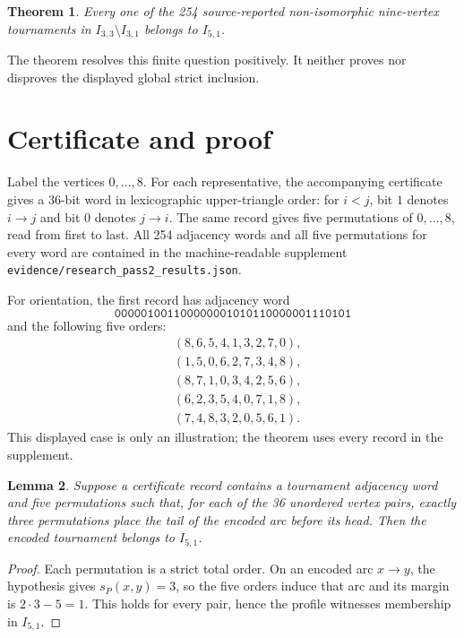 \documentclass[11pt]{article}
\newtheorem{theorem}{Theorem}
\newtheorem{lemma}[theorem]{Lemma}
\begin{document}
\begin{theorem}\label{thm:census}
Every one of the 254 source-reported non-isomorphic nine-vertex tournaments
in $I_{3,3}\setminus I_{3,1}$ belongs to $I_{5,1}$.
\end{theorem}

The theorem resolves this finite question positively.  It neither proves nor
disproves the displayed global strict inclusion.

\section{Certificate and proof}

Label the vertices $0,\ldots,8$.  For each representative, the accompanying
certificate gives a 36-bit word in lexicographic upper-triangle order:
for $i<j$, bit $1$ denotes $i\to j$ and bit $0$ denotes $j\to i$.  The same
record gives five permutations of $0,\ldots,8$, read from first to last.
All 254 adjacency words and all five permutations for every word are contained
in the machine-readable supplement
\texttt{evidence/research\_pass2\_results.json}.

For orientation, the first record has adjacency word
\[
\texttt{000001001100000001010110000001110101}
\]
and the following five orders:
\begin{align*}
 &(8,6,5,4,1,3,2,7,0),\\
 &(1,5,0,6,2,7,3,4,8),\\
 &(8,7,1,0,3,4,2,5,6),\\
 &(6,2,3,5,4,0,7,1,8),\\
 &(7,4,8,3,2,0,5,6,1).
\end{align*}
This displayed case is only an illustration; the theorem uses every record in
the supplement.

\begin{lemma}\label{lem:local}
Suppose a certificate record contains a tournament adjacency word and five
permutations such that, for each of the 36 unordered vertex pairs, exactly
three permutations place the tail of the encoded arc before its head.  Then
the encoded tournament belongs to $I_{5,1}$.
\end{lemma}

\begin{proof}
Each permutation is a strict total order.  On an encoded arc $x\to y$, the
hypothesis gives $s_P(x,y)=3$, so the five orders induce that arc and its
margin is $2\cdot3-5=1$.  This holds for every pair, hence the profile witnesses
membership in $I_{5,1}$.
\end{proof}
\end{document}
